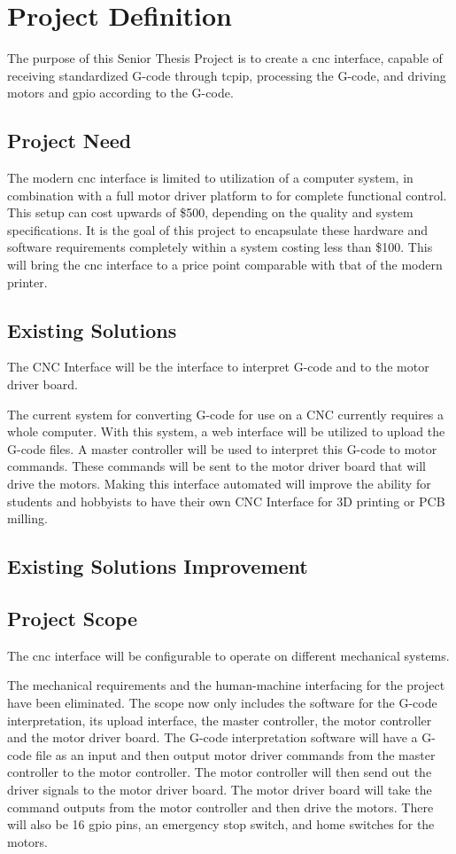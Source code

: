 \chapter{Project Definition}
The purpose of this Senior Thesis Project is to create a \gls{cnc} interface, capable of receiving standardized G-code through \gls{tcpip}, processing the G-code, and driving motors and \gls{gpio} according to the G-code. 

\section{Project Need}
The modern \gls{cnc} interface is limited to utilization of a computer system, in combination with a full motor driver platform to for complete functional control.
This setup can cost upwards of \$500, depending on the quality and system specifications.
It is the goal of this project to encapsulate these hardware and software requirements completely within a system costing less than \$100.
This will bring the \gls{cnc} interface to a price point comparable with tbat of the modern printer. 

\section{Existing Solutions}
The CNC Interface will be the interface to interpret G-code and to the motor driver board.

The current system for converting G-code for use on a CNC currently requires a whole computer. 
With this system, a web interface will be utilized to upload the G-code files.
A master controller will be used to interpret this G-code to motor commands. 
These commands will be sent to the motor driver board that will drive the motors.
Making this interface automated will improve the ability for students and hobbyists to have their own CNC Interface for 3D printing or PCB milling.

\section{Existing Solutions Improvement}

\section{Project Scope}
The \gls{cnc} interface will be configurable to operate on different mechanical systems. 

The mechanical requirements and the human-machine interfacing for the project have been eliminated.
The scope now only includes the software for the G-code interpretation, its upload interface, the master controller, the motor controller and the motor driver board.
The G-code interpretation software will have a G-code file as an input and then output motor driver commands from the master controller to the motor controller.
The motor controller will then send out the driver signals to the motor driver board. 
The motor driver board will take the command outputs from the motor controller and then drive the motors. 
There will also be 16 \gls{gpio} pins, an emergency stop switch, and home switches for the motors. 

